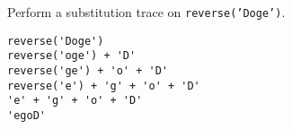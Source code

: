 Perform a substitution trace on \texttt{reverse('Doge')}.

\begin{answer}
\begin{lstlisting}
reverse('Doge')
reverse('oge') + 'D'
reverse('ge') + 'o' + 'D'
reverse('e') + 'g' + 'o' + 'D'
'e' + 'g' + 'o' + 'D'
'egoD'
\end{lstlisting}
\end{answer}